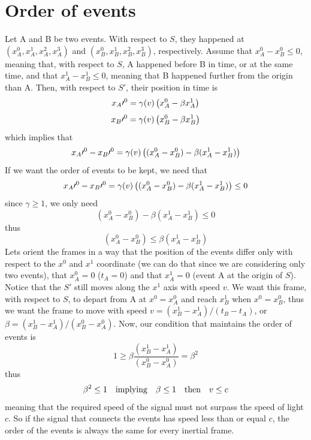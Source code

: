 \documentclass[oneside, 10pt, notitlepage]{book}
\begin{document}
\section{Order of events}

Let A and B be two events. With respect to \(S\), they happened at \((x_A^0,x_A^1,x_A^2,x_A^3)\) and \((x_B^0,x_B^1,x_B^2,x_B^3)\), respectively. Assume that \(x_A^0 - x_B^0 \leq 0\), meaning that, with respect to \(S\), A happened before B in time, or at the same time, and that \(x_A^1 - x_B^1 \leq 0\), meaning that B happened further from the origin than A. Then, with respect to \(S{\prime}\), their position in time is
\begin{equation}x_A{\prime}^0 = \gamma(v)\left(x_A^0 - \beta x_A^1\right)\end{equation}
\begin{equation}x_B{\prime}^0 = \gamma(v)\left(x_B^0 - \beta x_B^1\right)\end{equation}
which implies that 
\begin{equation}x_A{\prime}^0-x_B{\prime}^0 = \gamma(v)\left((x_A^0-x_B^0) - \beta (x_A^1-x_B^1)\right)\end{equation}
If we want the order of events to be kept, we need that 
\begin{equation}x_A{\prime}^0-x_B{\prime}^0 = \gamma(v)\left((x_A^0-x_B^0) - \beta (x_A^1-x_B^1)\right)\leq0\end{equation}
since \(\gamma \geq 1\), we only need 
\begin{equation}(x_A^0-x_B^0) - \beta (x_A^1-x_B^1)\leq0\end{equation}
thus
\begin{equation}(x_A^0-x_B^0) \leq \beta (x_A^1-x_B^1)\end{equation}
Lets orient the frames in a way that the position of the events differ only with respect to the \(x^0\) and \(x^1\) coordinate (we can do that since we are considering only two events), that \(x_A^0=0\) (\(t_A=0\)) and that \(x_A^1 = 0\) (event A at the origin of \(S\)). Notice that the \(S{\prime}\) still moves along the \(x^1\) axis with speed \(v\). We want this frame, with respect to \(S\), to depart from A at \(x^0 = x_A^0\) and reach \(x_B^1\) when \(x^0 = x_B^0\), thus we want the frame to move with speed \(v = (x_B^1 - x_A^1)/(t_B - t_A)\), or \(\beta = (x_B^1 - x_A^1)/(x_B^0 - x_A^0)\). Now, our condition that maintains the order of events is 
\begin{equation}1 \geq \beta \frac{(x_B^1-x_A^1)}{(x_B^0-x_A^0)} = \beta^2\end{equation}
thus
\begin{equation}\beta^2 \leq 1 \qq{implying} \beta \leq 1 \qq{then} v \leq c\end{equation}
meaning that the required speed of the signal must not surpass the speed of light \(c\). So if the signal that connects the events has speed less than or equal \(c\), the order of the events is always the same for every inertial frame.  
\end{document}
